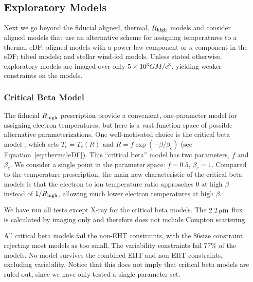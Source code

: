 \subsection{Exploratory Models}\label{sec:explore}

Next we go beyond the fiducial aligned, thermal, $R_\mathrm{high}$ models and consider aligned models that use an alternative scheme for assigning temperatures to a thermal eDF; aligned models with a power-law component or $\kappa$ component in the eDF; tilted models; and stellar wind-fed models.
Unless stated otherwise, exploratory models are imaged over only $5 \times 10^3 GM/c^3$, yielding weaker constraints on the models.

\subsubsection{Critical Beta Model}

The fiducial $R_\mathrm{high}$ prescription provide a convenient, one-parameter model for assigning electron temperatures, but here is a vast function space of possible alternative parameterizations.
One well-motivated choice is the critical beta model \citep{2020MNRAS.493.1404A}, which sets $T_e = T_e(R)$ and $R = f \exp(-\beta/\beta_c)$ (see Equation~\ref{eq:thermaleDF}).
This ``critical beta'' model has two parameters, $f$ and $\beta_c$.
We consider a single point in the parameter space: $f = 0.5$, $\beta_c = 1$.
Compared to the \Rh temperature prescription, the main new characteristic of the critical beta models is that the electron to ion temperature ratio approaches 0 at high $\beta$ instead of $1/R_\mathrm{high}$, allowing much lower electron temperatures at high $\beta$.

We have run all tests except X-ray for the critical beta models.
The $2.2\,\mu\mathrm{m}$ flux is calculated by imaging only and therefore does not include Compton scattering.

All critical beta models fail the non-EHT constraints, with the 86\GHz size constraint rejecting most models as too small.
The variability constraints fail $77\%$ of the models.
No model survives the combined EHT and non-EHT constraints, excluding variability.
Notice that this does not imply that critical beta models are ruled out, since we have only tested a single parameter set.


